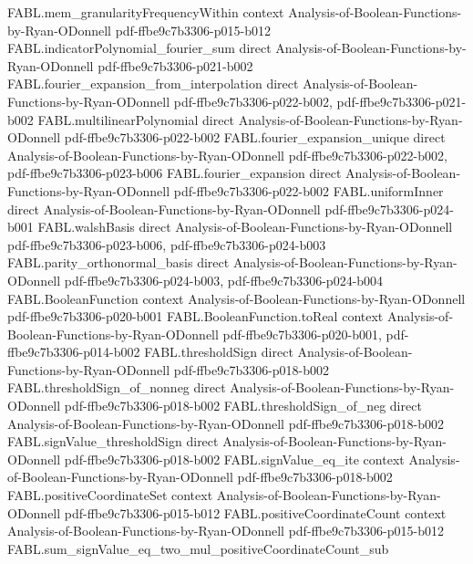 \begin{theorem}
  {FABL.mem_granularityFrequencyWithin}
  {context}
  {Analysis-of-Boolean-Functions-by-Ryan-ODonnell}
  {pdf-ffbe9c7b3306-p015-b012}
\proofstep
  {FABL.indicatorPolynomial_fourier_sum}
  {direct}
  {Analysis-of-Boolean-Functions-by-Ryan-ODonnell}
  {pdf-ffbe9c7b3306-p021-b002}
\proofstep
  {FABL.fourier_expansion_from_interpolation}
  {direct}
  {Analysis-of-Boolean-Functions-by-Ryan-ODonnell}
  {pdf-ffbe9c7b3306-p022-b002,
    pdf-ffbe9c7b3306-p021-b002}
\proofstep
  {FABL.multilinearPolynomial}
  {direct}
  {Analysis-of-Boolean-Functions-by-Ryan-ODonnell}
  {pdf-ffbe9c7b3306-p022-b002}
\proofstep
  {FABL.fourier_expansion_unique}
  {direct}
  {Analysis-of-Boolean-Functions-by-Ryan-ODonnell}
  {pdf-ffbe9c7b3306-p022-b002,
    pdf-ffbe9c7b3306-p023-b006}
\proofstep
  {FABL.fourier_expansion}
  {direct}
  {Analysis-of-Boolean-Functions-by-Ryan-ODonnell}
  {pdf-ffbe9c7b3306-p022-b002}
\proofstep
  {FABL.uniformInner}
  {direct}
  {Analysis-of-Boolean-Functions-by-Ryan-ODonnell}
  {pdf-ffbe9c7b3306-p024-b001}
\proofstep
  {FABL.walshBasis}
  {direct}
  {Analysis-of-Boolean-Functions-by-Ryan-ODonnell}
  {pdf-ffbe9c7b3306-p023-b006,
    pdf-ffbe9c7b3306-p024-b003}
\proofstep
  {FABL.parity_orthonormal_basis}
  {direct}
  {Analysis-of-Boolean-Functions-by-Ryan-ODonnell}
  {pdf-ffbe9c7b3306-p024-b003,
    pdf-ffbe9c7b3306-p024-b004}
\proofstep
  {FABL.BooleanFunction}
  {context}
  {Analysis-of-Boolean-Functions-by-Ryan-ODonnell}
  {pdf-ffbe9c7b3306-p020-b001}
\proofstep
  {FABL.BooleanFunction.toReal}
  {context}
  {Analysis-of-Boolean-Functions-by-Ryan-ODonnell}
  {pdf-ffbe9c7b3306-p020-b001,
    pdf-ffbe9c7b3306-p014-b002}
\proofstep
  {FABL.thresholdSign}
  {direct}
  {Analysis-of-Boolean-Functions-by-Ryan-ODonnell}
  {pdf-ffbe9c7b3306-p018-b002}
\proofstep
  {FABL.thresholdSign_of_nonneg}
  {direct}
  {Analysis-of-Boolean-Functions-by-Ryan-ODonnell}
  {pdf-ffbe9c7b3306-p018-b002}
\proofstep
  {FABL.thresholdSign_of_neg}
  {direct}
  {Analysis-of-Boolean-Functions-by-Ryan-ODonnell}
  {pdf-ffbe9c7b3306-p018-b002}
\proofstep
  {FABL.signValue_thresholdSign}
  {direct}
  {Analysis-of-Boolean-Functions-by-Ryan-ODonnell}
  {pdf-ffbe9c7b3306-p018-b002}
\proofstep
  {FABL.signValue_eq_ite}
  {context}
  {Analysis-of-Boolean-Functions-by-Ryan-ODonnell}
  {pdf-ffbe9c7b3306-p018-b002}
\proofstep
  {FABL.positiveCoordinateSet}
  {context}
  {Analysis-of-Boolean-Functions-by-Ryan-ODonnell}
  {pdf-ffbe9c7b3306-p015-b012}
\proofstep
  {FABL.positiveCoordinateCount}
  {context}
  {Analysis-of-Boolean-Functions-by-Ryan-ODonnell}
  {pdf-ffbe9c7b3306-p015-b012}
\proofstep
  {FABL.sum_signValue_eq_two_mul_positiveCoordinateCount_sub}

\end{theorem}
